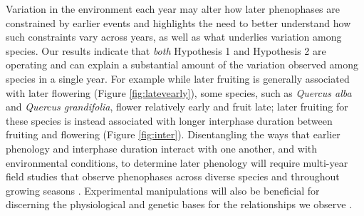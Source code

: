 \documentclass{article}
\begin{document}
\par Variation in the environment each year may alter how later phenophases are constrained by earlier events and highlights the need to better understand how such constraints vary across years, as well as what underlies variation among species. Our results indicate that \textit{both} Hypothesis 1 and Hypothesis 2 are operating and can explain a substantial amount of the variation observed among species in a single year. For example while later fruiting is generally associated with later flowering (Figure \ref{fig:latevearly}), some species, such as \textit{Quercus alba} and \textit{Quercus grandifolia}, flower relatively early and fruit late; later fruiting for these species is instead associated with longer interphase duration between fruiting and flowering (Figure \ref{fig:inter}). Disentangling the ways that earlier phenology and interphase duration interact with one another, and with environmental conditions, to determine later phenology will require multi-year field studies that observe phenophases across diverse species and throughout growing seasons \citep[e.g.,][]{elmendorf2016}. Experimental manipulations will also be beneficial for discerning the physiological and genetic bases for the relationships we observe \citep{flint1974}.
\end{document}
